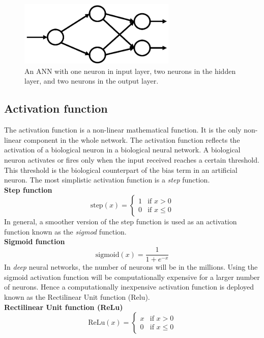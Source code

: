 \documentclass[12pt,a4paper,bold]{thesis}
\theoremstyle{thm}
\theoremstyle{definition}
\begin{document}
\begin{figure}[H]
	\centering
   \includegraphics[height=3.1cm]{Images/35.png} 
   \caption{An ANN with one neuron in input layer, two neurons in the hidden layer, and two neurons in the output layer.}
\end{figure}

\subsection{Activation function}
\indent\indent\indent The activation function is a non-linear mathematical function. It is the only non-linear component in the whole network. The activation function reflects the activation of a biological neuron in a biological neural network. A biological neuron activates or fires only when the input received reaches a certain threshold. This threshold is the biological counterpart of the bias term in an artificial neuron. The most simplistic activation function is a \textit{step} function.\\
\textbf{Step function}
\[
\text{step}(x)=
\begin{cases}
	1 & \text{if } x>0\\
	0 & \text{if } x\leq0
\end{cases}
\]
\indent\indent In general, a smoother version of the step function is used as an activation function known as the \textit{sigmod} function.\\
\textbf{Sigmoid function}
\[\text{sigmoid}(x)=\frac{1}{1+e^{-x}}\]
\indent\indent In \textit{deep} neural networks, the number of neurons will be in the millions. Using the sigmoid activation function will be computationally expensive for a larger number of neurons. Hence a computationally inexpensive activation function is deployed known as the Rectilinear Unit function (Relu).\\
\textbf{Rectilinear Unit function (ReLu)}
\[
\text{ReLu}(x)=
\begin{cases}
	x & \text{if } x>0\\
	0 & \text{if } x\leq0
\end{cases}
\]
\pagebreak
\end{document}
